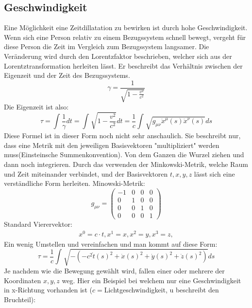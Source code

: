 \begin{refsection}
\subsection{Geschwindigkeit}
Eine M\"oglichkeit eine Zeitdillatation zu bewirken ist durch hohe Geschwindigkeit. Wenn sich eine Person relativ zu einem Bezugssystem schnell bewegt, vergeht f\"ur diese Person die Zeit im Vergleich zum Bezugssystem langsamer. Die Ver\"anderung wird durch den Lorentzfaktor beschrieben, welcher sich aus der Lorentztransformation herleiten l\"asst. Er beschreibt das Verh\"altnis zwischen der Eigenzeit und der Zeit des Bezugssystems.
\begin{equation}
    \gamma=\frac{1}{\sqrt{1-\displaystyle\frac{v^2}{c^2}}} 
\end{equation}
Die Eigenzeit ist also:
\begin{equation}
    \tau
    =
    \int_{}^{}\frac{1}{\gamma}dt=\int_{}^{}\sqrt{1-\frac{v^2}{c^2}}dt
    =
    \frac{1}{c}\int_{}^{}\sqrt{g_{\mu\nu}\dot{x}^{\mu}(s)\dot{x}^{\nu}(s)}ds
\end{equation}
Diese Formel ist in dieser Form noch nicht sehr anschaulich. Sie beschreibt nur, dass eine Metrik mit den jeweiligen Basisvektoren "multipliziert" werden muss(Einsteinsche Summenkonvention). Von dem Ganzen die Wurzel ziehen und dann noch integrieren.
Durch das verwenden der Minkowski-Metrik, welche Raum und Zeit miteinander verbindet, und der Basisvektoren $t, x, y, z$ l\"asst sich eine verst\"andliche Form herleiten. 
Minowski-Metrik:
\begin{equation}
    g_{\mu\nu}=
    \begin{pmatrix}
        -1 & 0 & 0 & 0 \\
        0 & 1 & 0 & 0 \\
        0 & 0 & 1 & 0 \\
        0 & 0 & 0 & 1
    \end{pmatrix}
\end{equation}
Standard Vierervektor:
\begin{align*}
    x^{0}=c \cdot t,
    x^{1}=x,
    x^{2}=y,
    x^{3}=z,
\end{align*}
Ein wenig Umstellen und vereinfachen und man kommt auf diese Form:
\begin{equation}
    \tau
    =
    \frac{1}{c}\int_{}^{}\sqrt{-(-c^2\dot{t}(s)^{2}+\dot{x}(s)^{2}+\dot{y}(s)^{2}+\dot{z}(s)^{2})}ds
\end{equation}
Je nachdem wie die Bewegung gew\"ahlt wird, fallen einer oder mehrere der Koordinaten $x, y, z$ weg.
Hier ein Beispiel bei welchem nur eine Geschwindigkeit in x-Richtung vorhanden ist ($c=$Lichtgeschwindigkeit, u beschreibt den Bruchteil):

\end{refsection}
